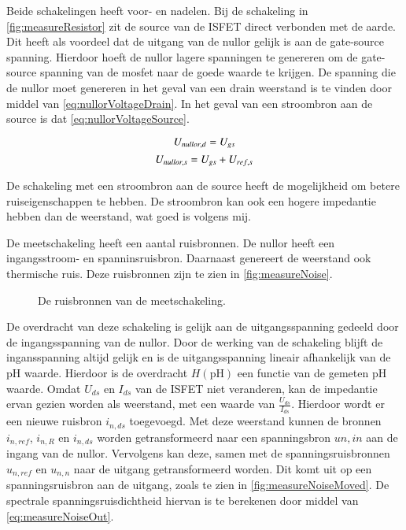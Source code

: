 Beide schakelingen heeft voor- en nadelen.
Bij de schakeling in \autoref{fig:measureResistor} zit de source van de ISFET direct verbonden met de aarde. Dit heeft als voordeel dat de uitgang van de nullor gelijk is aan de gate-source spanning. Hierdoor hoeft de nullor lagere spanningen te genereren om de gate-source spanning van de mosfet naar de goede waarde te krijgen. De spanning die de nullor moet genereren in het geval van een drain weerstand is te vinden door middel van \autoref{eq:nullorVoltageDrain}. In het geval van een stroombron aan de source is dat \autoref{eq:nullorVoltageSource}.

\begin{equation}\label{eq:nullorVoltageDrain}
    U_{nullor,d} = U_{gs}
    \tagaddtext{[\si{\volt}]}
\end{equation}
\begin{equation}\label{eq:nullorVoltageSource}
    U_{nullor,s} = U_{gs} + U_{ref,s}
    \tagaddtext{[\si{\volt}]}
\end{equation}

De schakeling met een stroombron aan de source heeft de mogelijkheid om betere ruiseigenschappen te hebben. De stroombron kan ook een hogere impedantie hebben dan de weerstand, wat goed is volgens mij. 

\newcommand\ph{\mathrm{pH}}

De meetschakeling heeft een aantal ruisbronnen. De nullor heeft een ingangsstroom- en spanninsruisbron. Daarnaast genereert de weerstand ook thermische ruis. Deze ruisbronnen zijn te zien in \autoref{fig:measureNoise}.
\begin{figure}[ht]
    \centering
    \def\svgwidth{0.6\textwidth}
    
    \caption{De ruisbronnen van de meetschakeling.}
    \label{fig:measureNoise}
\end{figure}

De overdracht van deze schakeling is gelijk aan de uitgangsspanning gedeeld door de ingangsspanning van de nullor. Door de werking van de schakeling blijft de ingansspanning altijd gelijk en is de uitgangsspanning lineair afhankelijk van de pH waarde. Hierdoor is de overdracht $H(\ph)$ een functie van de gemeten pH waarde.
Omdat $U_{ds}$ en $I_{ds}$ van de ISFET niet veranderen, kan de impedantie ervan gezien worden als weerstand, met een waarde van $\frac{U_{ds}}{I_{ds}}$. Hierdoor wordt er een nieuwe ruisbron $i_{n,ds}$ toegevoegd. Met deze weerstand kunnen de bronnen $i_{n,ref}$, $i_{n,R}$ en $i_{n,ds}$ worden getransformeerd naar een spanningsbron $u{n,in}$ aan de ingang van de nullor.
Vervolgens kan deze, samen met de spanningsruisbronnen $u_{n,ref}$ en $u_{n,n}$ naar de uitgang getransformeerd worden. Dit komt uit op een spanningsruisbron aan de uitgang, zoals te zien in \autoref{fig:measureNoiseMoved}. De spectrale spanningsruisdichtheid hiervan is te berekenen door middel van \autoref{eq:measureNoiseOut}.

